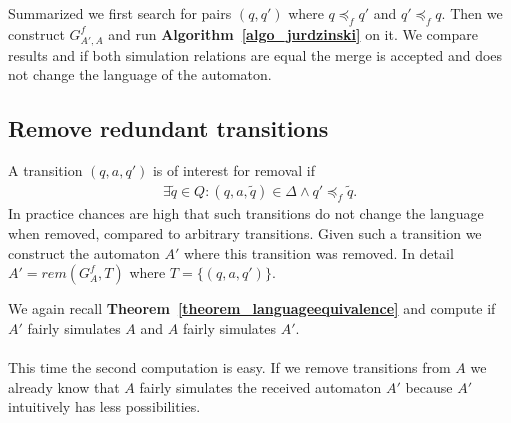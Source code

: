 \documentclass[12pt,oneside,bibliography=totoc,abstracton]{scrartcl}
\newcommand{\theoremref}[1]{\textbf{Theorem~\ref{#1}}}
\newcommand{\algoref}[1]{\textbf{Algorithm~\ref{#1}}}
\begin{document}
Summarized we first search for pairs $(q, q')$ where $q \preceq_f q'$ and $q' \preceq_f q$.
Then we construct $G^f_{A', A}$ and run \algoref{algo_jurdzinski} on it.
We compare results and if both simulation relations are equal the merge is accepted
and does not change the language of the automaton.

\subsection{Remove redundant transitions}\label{section_removetransitions}
A transition $(q, a, q')$ is of interest for removal if
\begin{align*}
	\exists \tilde{q} \in Q : (q, a, \tilde{q}) \in \Delta \land q' \preceq_f \tilde{q}.
\end{align*}
In practice chances are high that such transitions do not change the language when
removed, compared to arbitrary transitions. Given such a transition we construct the
automaton $A'$ where this transition was removed. In detail $A' = rem(G^f_A, T)$ where $T = \{(q, a, q')\}$.

We again recall \theoremref{theorem_languageequivalence} and compute if $A'$ fairly simulates $A$ and $A$ fairly simulates $A'$.\\\\
This time the second computation is easy. If we remove transitions from $A$ we already know that $A$ fairly
simulates the received automaton $A'$ because $A'$ intuitively has less possibilities.
\end{document}
